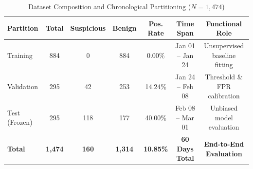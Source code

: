 \begin{table}[htbp]
\centering
\caption{Dataset Composition and Chronological Partitioning ($N=1{,}474$)}
\label{tab:dataset_composition}
\begin{tabular}{lcccccc}
\toprule
\textbf{Partition} & \textbf{Total} & \textbf{Suspicious} & \textbf{Benign} & \textbf{Pos. Rate} & \textbf{Time Span} & \textbf{Functional Role} \\
\midrule
Training & 884 & 0 & 884 & 0.00\% & Jan 01 -- Jan 24 & Unsupervised baseline fitting \\
Validation & 295 & 42 & 253 & 14.24\% & Jan 24 -- Feb 08 & Threshold \& FPR calibration \\
Test (Frozen) & 295 & 118 & 177 & 40.00\% & Feb 08 -- Mar 01 & Unbiased model evaluation \\
\midrule
\textbf{Total} & \textbf{1,474} & \textbf{160} & \textbf{1,314} & \textbf{10.85\%} & \textbf{60 Days Total} & \textbf{End-to-End Evaluation} \\
\bottomrule
\end{tabular}
\end{table}

